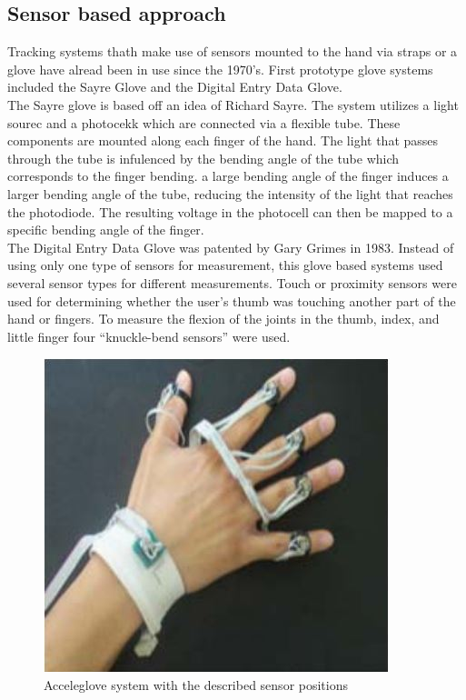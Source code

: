 \subsection{Sensor based approach}
\label{Sensor based approach}
Tracking systems thath make use of sensors mounted to the hand via straps or a glove have alread been in use since the 1970's. First prototype glove systems included the Sayre Glove\cite{ThomasA.DeFanti.1977} and the Digital Entry Data Glove\cite{Grimes.1983}.\\
The Sayre glove is based off an idea of Richard Sayre. The system utilizes a light sourec and a photocekk which are connected via a flexible tube. These components are mounted along each finger of the hand. The light that passes through the tube is infulenced by the bending angle of the tube which corresponds to the finger bending.
a large bending angle of the finger induces a larger bending angle of the tube, reducing the intensity of the light that reaches the photodiode. The resulting voltage in the photocell can then be mapped to a specific bending angle of the finger.\\
The Digital Entry Data Glove was patented by Gary Grimes in 1983. Instead of using only one type of sensors for measurement, this glove based systems used several sensor types for different measurements.
Touch or proximity sensors were used for determining whether the user’s thumb was touching another part of the hand or fingers. To measure the flexion of the joints in the thumb, index, and little finger four “knuckle-bend sensors” were used.
\begin{figure}
\label{acceleglove}
\includegraphics[scale=0.5]{images/acceleglove.JPG} 
\caption{Acceleglove system with the described sensor positions \cite{HernandezRebollar.2002}}
\end{figure}
